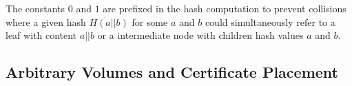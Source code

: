 \documentclass[10pt,conference,compsocconf]{IEEEtran}
\begin{document}
The constants $0$ and $1$ are prefixed in the hash computation to prevent collisions where a given hash $H(a || b)$ for some $a$ and $b$ could simultaneously refer to a leaf with content $a || b$ or a intermediate node with children hash values $a$ and $b$.

%
%

\subsection{Arbitrary Volumes and Certificate Placement}
\label{sec:data-structure:arbitrary-volumes}
\end{document}
